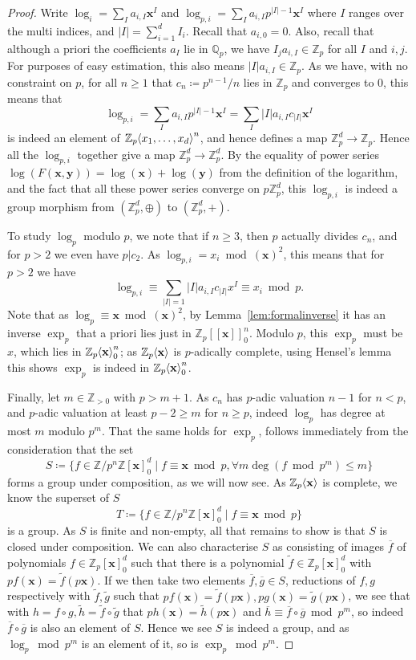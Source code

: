 \documentclass[12pt]{article}
\newcommand{\Z}{\mathbb{Z}}
\newcommand{\Q}{\mathbb{Q}}
\newcommand{\vx}{\mathbf{x}}
\newcommand{\vy}{\mathbf{y}}
\renewcommand{\angle}[1]{\hspace{-2pt}\left\langle #1 \right\rangle}
\theoremstyle{plain}
\theoremstyle{definition}
\theoremstyle{remark}
\begin{document}
\begin{proof}
Write $\log_{i} = \sum_{I} a_{i,I} \vx^I$ and $\log_{p,i} = \sum_I a_{i,I} p^{|I|-1} \vx^I$ where $I$ ranges over the multi indices, and $|I| = \sum_{i=1}^d I_i$. Recall that $a_{i,0} = 0$. Also, recall that although a priori the coefficients $a_I$ lie in $\Q_p$, we have $I_j a_{i,I} \in \Z_p$ for all $I$ and $i,j$. For purposes of easy estimation, this also means $|I|a_{i,I} \in \Z_p$. As we have, with no constraint on $p$, for all $n\geq 1$ that $c_n\coloneqq p^{n-1}/n$ lies in $\Z_p$ and converges to $0$, this means that \[ \log_{p,i} = \sum_I a_{i,I} p^{|I|-1} \vx^I = \sum_I |I|a_{i,I} c_{|I|} \vx^I\] is indeed an element of $\Z_p\angle{x_1,\dots,x_d}^n$, and hence defines a map $\Z_p^d \to \Z_p$. Hence all the $\log_{p,i}$ together give a map $\Z_p^d \to \Z_p^d$. By the equality of power series $\log(F(\vx,\vy)) = \log(\vx)+\log(\vy)$ from the definition of the logarithm, and the fact that all these power series converge on $p\Z_p^d$, this $\log_{p,i}$ is indeed a group morphism from $(\Z_p^d,\oplus)$ to $(\Z_p^d,+)$.

To study $\log_p$ modulo $p$, we note that if $n\geq 3$, then $p$ actually divides $c_n$, and for $p > 2$ we even have $p|c_2$. As $\log_{p,i} = x_i \bmod (\vx)^2$, this means that for $p > 2$ we have \[\log_{p,i} \equiv \sum_{|I| = 1} |I|a_{i,I}c_{|I|} x^I \equiv x_i \bmod p.\]
Note that as $\log_p \equiv \vx \bmod (\vx)^2$, by Lemma~\ref{lem:formalinverse} it has an inverse $\exp_p$ that a priori lies just in $\Z_p[[\vx]]_0^n$. Modulo $p$, this $\exp_p$ must be $x$, which lies in $\Z_p\angle{\vx}_0^n$; as $\Z_p\angle{\vx}$ is $p$-adically complete, using Hensel's lemma this shows $\exp_p$ is indeed in $\Z_p\angle{\vx}_0^n$.

Finally, let $m \in \Z_{>0}$ with $p > m+1$. As $c_n$ has $p$-adic valuation $n-1$ for $n < p$, and $p$-adic valuation at least $p-2 \geq m$ for $n \geq p$, indeed $\log_p$ has degree at most $m$ modulo $p^m$. That the same holds for $\exp_p$, follows immediately from the consideration that the set
\[
S \coloneqq \{f \in \Z/p^n\Z[\vx]_0^d \mid  f \equiv \vx \bmod p, \forall m \deg(f \bmod p^m) \leq m\}
\]
forms a group under composition, as we will now see. As $\Z_p\angle{\vx}$ is complete, we know the superset of $S$
\[
T \coloneqq \{f \in \Z/p^n\Z[\vx]_0^d \mid  f \equiv \vx \bmod p\}
\]
is a group. As $S$ is finite and non-empty, all that remains to show is that $S$ is closed under composition. We can also characterise $S$ as consisting of images $\overline{f}$ of polynomials $f \in \Z_p[\vx]_0^d$ such that there is a polynomial $\widetilde{f}\in\Z_p[\vx]_0^d$ with $pf(\vx) = \widetilde{f}(p\vx)$. If we then take two elements $\overline{f},\overline{g} \in S$, reductions of $f,g$ respectively with $\widetilde{f},\widetilde{g}$ such that $pf(\vx) = \widetilde{f}(p\vx), pg(\vx) = \widetilde{g}(p\vx)$, we see that with $h = f\circ g, \widetilde{h} = \widetilde{f} \circ \widetilde{g}$ that $ph(\vx) = \widetilde{h}(p\vx)$ and $\overline{h} \equiv \overline{f} \circ \overline{g} \bmod p^m$, so indeed $\overline{f} \circ \overline{g}$ is also an element of $S$. Hence we see $S$ is indeed a group, and as $\log_p \bmod p^m$ is an element of it, so is $\exp_p \bmod p^m$.
\end{proof}
\end{document}
